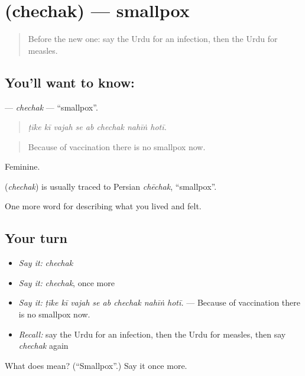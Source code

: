 \section[\texorpdfstring{\ur{چیچک} (chechak)}{چیچک (chechak)}]{ (chechak) — smallpox}

\label{lesson:UR-C474-chechak}



\begin{quote}
Before the new one: say the Urdu for an infection, then the Urdu for measles.
\end{quote}

\subsection*{You'll want to know: }
\textbf{} — \emph{chechak} — \textquotedblleft{}smallpox\textquotedblright{}.

\begin{quote}
       
\end{quote}

\begin{quote}
\emph{ṭīke kī vajah se ab chechak nahīṅ hotī.}
\end{quote}

\begin{quote}
Because of vaccination there is no smallpox now.
\end{quote}

Feminine.

\begin{cousinweb}
\textbf{} (\emph{chechak}) is usually traced to Persian \emph{chēchak}, \textquotedblleft{}smallpox\textquotedblright{}.
\end{cousinweb}

\begin{grammarlens}[title={What you've built}]
One more word for describing what you lived and felt.
\end{grammarlens}

\subsection*{Your turn}
\begin{itemize}
\raggedright
  \item \emph{Say it:} \emph{chechak}
  \item \emph{Say it:} \emph{chechak}, once more
  \item \emph{Say it:} \emph{ṭīke kī vajah se ab chechak nahīṅ hotī.} — Because of vaccination there is no smallpox now.
  \item \emph{Recall:} say the Urdu for an infection, then the Urdu for measles, then say \emph{chechak} again
\end{itemize}

\begin{tcolorbox}[breakable,colback=teal!4,colframe=teal!35!black,title={Before you move on}]
What does  mean? (\textquotedblleft{}Smallpox\textquotedblright{}.) Say it once more.
\end{tcolorbox}
